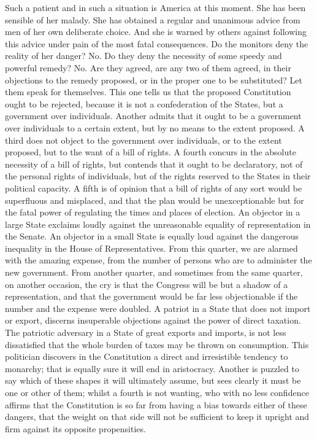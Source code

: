 Such a patient and in such a situation is America at this moment. 
She has been sensible of her malady. 
She has obtained a regular and unanimous advice from men of her own deliberate choice. 
And she is warned by others against following this advice under pain of the most fatal consequences. 
Do the monitors deny the reality of her danger? 
No. 
Do they deny the necessity of some speedy and powerful remedy? 
No. 
Are they agreed, are any two of them agreed, in their objections to the remedy proposed, or in the proper one to be substituted? 
Let them speak for themselves. 
This one tells us that the proposed Constitution ought to be rejected, because it is not a confederation of the States, but a government over individuals. 
Another admits that it ought to be a government over individuals to a certain extent, but by no means to the extent proposed. 
A third does not object to the government over individuals, or to the extent proposed, but to the want of a bill of rights. 
A fourth concurs in the absolute necessity of a bill of rights, but contends that it ought to be declaratory, not of the personal rights of individuals, but of the rights reserved to the States in their political capacity. 
A fifth is of opinion that a bill of rights of any sort would be superfluous and misplaced, and that the plan would be unexceptionable but for the fatal power of regulating the times and places of election. 
An objector in a large State exclaims loudly against the unreasonable equality of representation in the Senate. 
An objector in a small State is equally loud against the dangerous inequality in the House of Representatives. 
From this quarter, we are alarmed with the amazing expense, from the number of persons who are to administer the new government. 
From another quarter, and sometimes from the same quarter, on another occasion, the cry is that the Congress will be but a shadow of a representation, and that the government would be far less objectionable if the number and the expense were doubled. 
A patriot in a State that does not import or export, discerns insuperable objections against the power of direct taxation. 
The patriotic adversary in a State of great exports and imports, is not less dissatisfied that the whole burden of taxes may be thrown on consumption. 
This politician discovers in the Constitution a direct and irresistible tendency to monarchy; that is equally sure it will end in aristocracy. 
Another is puzzled to say which of these shapes it will ultimately assume, but sees clearly it must be one or other of them; whilst a fourth is not wanting, who with no less confidence affirms that the Constitution is so far from having a bias towards either of these dangers, that the weight on that side will not be sufficient to keep it upright and firm against its opposite propensities. 
